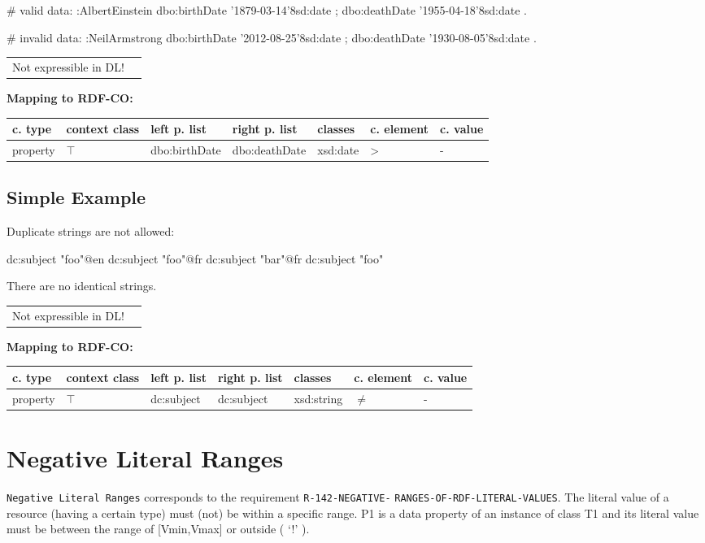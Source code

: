 \documentclass{llncs}
\newcommand{\ms}[1]{\texttt{#1}}
\newenvironment{gcotable}{
  \scriptsize
  \sffamily
  \vspace{0cm}
	\begin{center}
	\textbf{\vspace{0.4cm}Mapping to RDF-CO:} \\
  \begin{tabular}{l|l|l|l|l|l|l}
	\hline
  \textbf{c. type} & \textbf{context class} & \textbf{left p. list} & \textbf{right p. list} & \textbf{classes} & \textbf{c. element} & \textbf{c. value} \\
  \hline

}{
  \hline
  \end{tabular}
	\end{center}
}
\newenvironment{DL}{
  \vspace{0cm}
	\begin{center}
  \begin{tabular}{r l}

}{
  \end{tabular}
	\end{center}
}
\begin{document}
\begin{ex}
# valid data:
:AlbertEinstein
    dbo:birthDate '1879-03-14'^^xsd:date ;
    dbo:deathDate '1955-04-18'^^xsd:date .
\end{ex}

\begin{ex}
# invalid data:
:NeilArmstrong
    dbo:birthDate '2012-08-25'^^xsd:date ;
    dbo:deathDate '1930-08-05'^^xsd:date .
\end{ex}

\begin{DL}
Not expressible in DL!
\end{DL}

\begin{gcotable}
property & $\top$ & dbo:birthDate & dbo:deathDate & xsd:date & \textgreater & - \\
\end{gcotable}

\subsection{Simple Example}

Duplicate strings are not allowed:

\begin{ex}
dc:subject "foo"@en
dc:subject "foo"@fr
dc:subject "bar"@fr
dc:subject "foo"
\end{ex}

There are no identical strings.

\begin{DL}
Not expressible in DL!
\end{DL}

\begin{gcotable}
property & $\top$ & dc:subject & dc:subject & xsd:string & $\neq$ & - \\
\end{gcotable}

\section{Negative Literal Ranges}

\ms{Negative Literal Ranges} corresponds to the requirement
\ms{R-142-NEGATIVE-} \ms{RANGES-OF-RDF-LITERAL-VALUES}.
The literal value of a resource (having a certain type) must (not) be within a specific range.
P1 is a data property of an instance of class T1 and its literal value must be between the range of [Vmin,Vmax] or outside ( ‘!' ).
\end{document}
